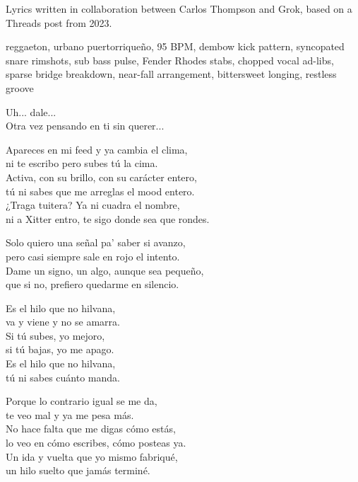 
\begin{notes}
Lyrics written in collaboration between Carlos Thompson and Grok, based on a Threads post from 2023.
\end{notes}
\begin{style}
reggaeton, urbano puertorriqueño, 95 BPM, dembow kick pattern, syncopated snare rimshots, sub bass pulse, Fender Rhodes stabs, chopped vocal ad-libs, sparse bridge breakdown, near-fall arrangement, bittersweet longing, restless groove
\end{style}
\begin{lyrics}
Uh... dale...\\
Otra vez pensando en ti sin querer...

Apareces en mi feed y ya cambia el clima,\\
ni te escribo pero subes tú la cima.\\
Activa, con su brillo, con su carácter entero,\\
tú ni sabes que me arreglas el mood entero.\\
¿Traga tuitera? Ya ni cuadra el nombre,\\
ni a Xitter entro, te sigo donde sea que rondes.

Solo quiero una señal pa' saber si avanzo,\\
pero casi siempre sale en rojo el intento.\\
Dame un signo, un algo, aunque sea pequeño,\\
que si no, prefiero quedarme en silencio.

Es el hilo que no hilvana,\\
va y viene y no se amarra.\\
Si tú subes, yo mejoro,\\
si tú bajas, yo me apago.\\
Es el hilo que no hilvana,\\
tú ni sabes cuánto manda.

Porque lo contrario igual se me da,\\
te veo mal y ya me pesa más.\\
No hace falta que me digas cómo estás,\\
lo veo en cómo escribes, cómo posteas ya.\\
Un ida y vuelta que yo mismo fabriqué,\\
un hilo suelto que jamás terminé.


\end{lyrics}
